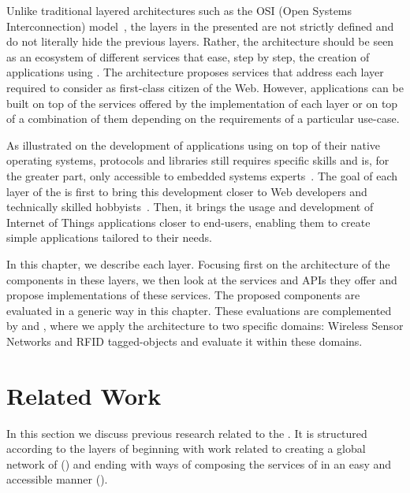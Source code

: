 Unlike traditional layered architectures such as the OSI (Open Systems Interconnection) model~\cite{Day1983}, the layers in the presented \WoTA{} are not strictly defined and do not literally hide the previous layers. Rather, the architecture should be seen as an ecosystem of different services that ease, step by step, the creation of applications using \sts{}. The architecture proposes services that address each layer required to consider \sts{} as first-class citizen of the Web. However, applications can be built on top of the services offered by the implementation of each layer or on top of a combination of them depending on the requirements of a particular use-case.

As illustrated on  the development of applications using \sts{} on top of their native operating systems, protocols and libraries still requires specific skills and is, for the greater part, only accessible to embedded systems experts~\cite{Mottola2011}. The goal of each layer of the \WoTA{} is first to bring this development closer to Web developers and technically skilled hobbyists~\cite{Hartmann2008}. Then, it brings the usage and development of Internet of Things applications closer to end-users, enabling them to create simple applications tailored to their needs.

In this chapter, we describe each layer. Focusing first on the architecture of the components in these layers, we then look at the services and APIs they offer and propose implementations of these services. The proposed components are evaluated in a generic way in this chapter. These evaluations are complemented by  and , where we apply the architecture to two specific domains: Wireless Sensor Networks and RFID tagged-objects and evaluate it within these domains.









\section{Related Work}\label{relatedWork}
In this section we discuss previous research related to the \WoTA{}. It is structured according to the layers of \WoTA{} beginning with work related to creating a global network of \sts{} (\devLayer{}) and ending with ways of composing the services of \sts{} in an easy and accessible manner (\compoLayer{}).

